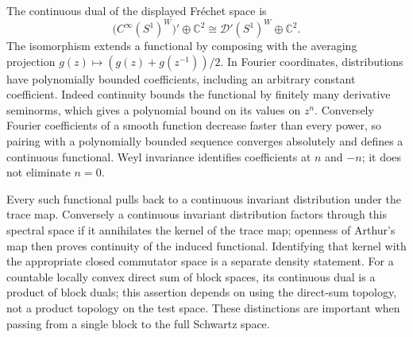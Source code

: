 The continuous dual of the displayed Fr\'echet space is
\[\big(C^\infty(S^1)^W\big)'\oplus\mathbb C^2\cong\mathcal D'(S^1)^W\oplus\mathbb C^2.\]
The isomorphism extends a functional by composing with the averaging projection $g(z)\mapsto(g(z)+g(z^{-1}))/2$. In Fourier coordinates, distributions have polynomially bounded coefficients, including an arbitrary constant coefficient. Indeed continuity bounds the functional by finitely many derivative seminorms, which gives a polynomial bound on its values on $z^n$. Conversely Fourier coefficients of a smooth function decrease faster than every power, so pairing with a polynomially bounded sequence converges absolutely and defines a continuous functional. Weyl invariance identifies coefficients at $n$ and $-n$; it does not eliminate $n=0$.

Every such functional pulls back to a continuous invariant distribution under the trace map. Conversely a continuous invariant distribution factors through this spectral space if it annihilates the kernel of the trace map; openness of Arthur's map then proves continuity of the induced functional. Identifying that kernel with the appropriate closed commutator space is a separate density statement. For a countable locally convex direct sum of block spaces, its continuous dual is a product of block duals; this assertion depends on using the direct-sum topology, not a product topology on the test space. These distinctions are important when passing from a single block to the full Schwartz space.

